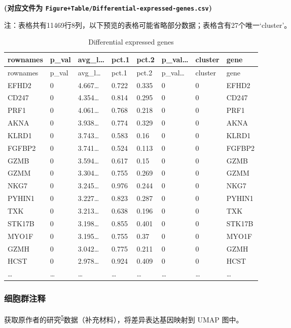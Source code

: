 \documentclass[
]{article}
\begin{document}
\textbf{(对应文件为 \texttt{Figure+Table/Differential-expressed-genes.csv})}

\begin{center}\begin{tcolorbox}[colback=gray!10, colframe=gray!50, width=0.9\linewidth, arc=1mm, boxrule=0.5pt]注：表格共有11469行8列，以下预览的表格可能省略部分数据；表格含有27个唯一`cluster'。
\end{tcolorbox}
\end{center}

\begin{longtable}[]{@{}llllllll@{}}
\caption{\label{tab:Differential-expressed-genes}Differential expressed genes}\tabularnewline
\toprule
rownames & p\_val & avg\_l\ldots{} & pct.1 & pct.2 & p\_val\ldots{} & cluster & gene\tabularnewline
\midrule
\endfirsthead
\toprule
rownames & p\_val & avg\_l\ldots{} & pct.1 & pct.2 & p\_val\ldots{} & cluster & gene\tabularnewline
\midrule
\endhead
EFHD2 & 0 & 4.667\ldots{} & 0.722 & 0.335 & 0 & 0 & EFHD2\tabularnewline
CD247 & 0 & 4.354\ldots{} & 0.814 & 0.295 & 0 & 0 & CD247\tabularnewline
PRF1 & 0 & 4.061\ldots{} & 0.768 & 0.218 & 0 & 0 & PRF1\tabularnewline
AKNA & 0 & 3.938\ldots{} & 0.774 & 0.329 & 0 & 0 & AKNA\tabularnewline
KLRD1 & 0 & 3.743\ldots{} & 0.583 & 0.16 & 0 & 0 & KLRD1\tabularnewline
FGFBP2 & 0 & 3.741\ldots{} & 0.524 & 0.113 & 0 & 0 & FGFBP2\tabularnewline
GZMB & 0 & 3.594\ldots{} & 0.617 & 0.15 & 0 & 0 & GZMB\tabularnewline
GZMM & 0 & 3.304\ldots{} & 0.755 & 0.269 & 0 & 0 & GZMM\tabularnewline
NKG7 & 0 & 3.245\ldots{} & 0.976 & 0.244 & 0 & 0 & NKG7\tabularnewline
PYHIN1 & 0 & 3.227\ldots{} & 0.823 & 0.287 & 0 & 0 & PYHIN1\tabularnewline
TXK & 0 & 3.213\ldots{} & 0.638 & 0.196 & 0 & 0 & TXK\tabularnewline
STK17B & 0 & 3.198\ldots{} & 0.855 & 0.401 & 0 & 0 & STK17B\tabularnewline
MYO1F & 0 & 3.195\ldots{} & 0.755 & 0.37 & 0 & 0 & MYO1F\tabularnewline
GZMH & 0 & 3.042\ldots{} & 0.775 & 0.211 & 0 & 0 & GZMH\tabularnewline
HCST & 0 & 2.978\ldots{} & 0.924 & 0.409 & 0 & 0 & HCST\tabularnewline
\ldots{} & \ldots{} & \ldots{} & \ldots{} & \ldots{} & \ldots{} & \ldots{} & \ldots{}\tabularnewline
\bottomrule
\end{longtable}

\hypertarget{ux7ec6ux80deux7fa4ux6ce8ux91ca-1}{%
\subsubsection{细胞群注释}\label{ux7ec6ux80deux7fa4ux6ce8ux91ca-1}}

获取原作者的研究\textsuperscript{\protect\hyperlink{ref-IntegrativeSinYuZh2023}{5}}数据（补充材料），将差异表达基因映射到 UMAP 图中。
\end{document}
